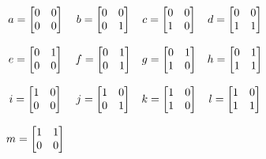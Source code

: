 \begin{mdframed}[style=darkAnswer,frametitle={Joe Starr}]
$$
\begin{matrix}
a=\begin{bmatrix}0&0\\0&0\end{bmatrix}&
b=\begin{bmatrix}0&0\\0&1\end{bmatrix}&
c=\begin{bmatrix}0&0\\1&0\end{bmatrix}&
d=\begin{bmatrix}0&0\\1&1\end{bmatrix}\\ \hspace{.5in} \\
e=\begin{bmatrix}0&1\\0&0\end{bmatrix}&
f=\begin{bmatrix}0&1\\0&1\end{bmatrix}&
g=\begin{bmatrix}0&1\\1&0\end{bmatrix}&
h=\begin{bmatrix}0&1\\1&1\end{bmatrix}\\ \hspace{.5in} \\
i=\begin{bmatrix}1&0\\0&0\end{bmatrix}&
j=\begin{bmatrix}1&0\\0&1\end{bmatrix}&
k=\begin{bmatrix}1&0\\1&0\end{bmatrix}&
l=\begin{bmatrix}1&0\\1&1\end{bmatrix}\\ \hspace{.5in} \\
m=\begin{bmatrix}1&1\\0&0\end{bmatrix}&

\end{matrix}$$
\end{mdframed}
